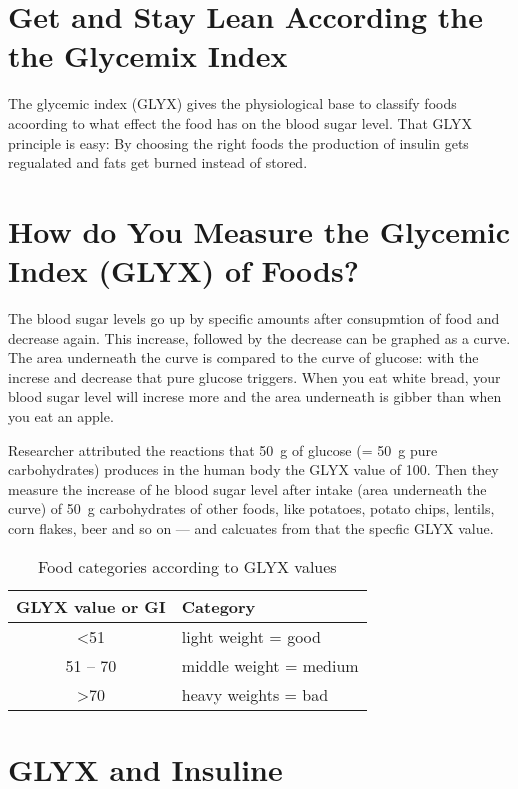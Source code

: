 \documentclass[../main.tex]{subfiles}
\begin{document}
\label{glycemic}

\section{Get and Stay Lean According the the Gly\-ce\-mix Index}

The glycemic index (GLYX) gives the physiological base to classify foods acoording to
what effect the food has on the blood sugar level.
That GLYX principle is easy: By choosing the right foods the production of insulin gets regualated and fats get burned instead of stored.

\section{How do You Measure the Glycemic Index (GLYX) of Foods?}

The blood sugar levels go up by specific amounts after consupmtion of food and decrease again.
This increase, followed by the decrease can be graphed as a curve.
The area underneath the curve is compared to the curve of glucose: with the increse and decrease that pure glucose triggers.
When you eat white bread, your blood sugar level will increse more and the area underneath is gibber than when you eat an apple.

Researcher attributed the reactions that \SI{50}{\gram} of glucose (= \SI{50}{\gram} pure carbohydrates) produces in the human body the GLYX value of 100.
Then they measure the increase of he blood sugar level after intake (area underneath the curve)
of \SI{50}{\gram} carbohydrates of other foods, like potatoes, potato chips, lentils, corn flakes, beer and so on --- and calcuates from that the specfic GLYX value.

\begin{table}[htb!]
  \centering
  \begin{tabular}{cl}
    \textbf{GLYX value or GI} & \textbf{Category} \\
    \hline
    \textless 51 & light weight = good \\
    51 -- 70 & middle weight = medium \\
    \textgreater 70 & heavy weights = bad \\
  \end{tabular}
  \caption{Food categories according to GLYX values}
\end{table}

\section{GLYX and Insuline}
\end{document}
